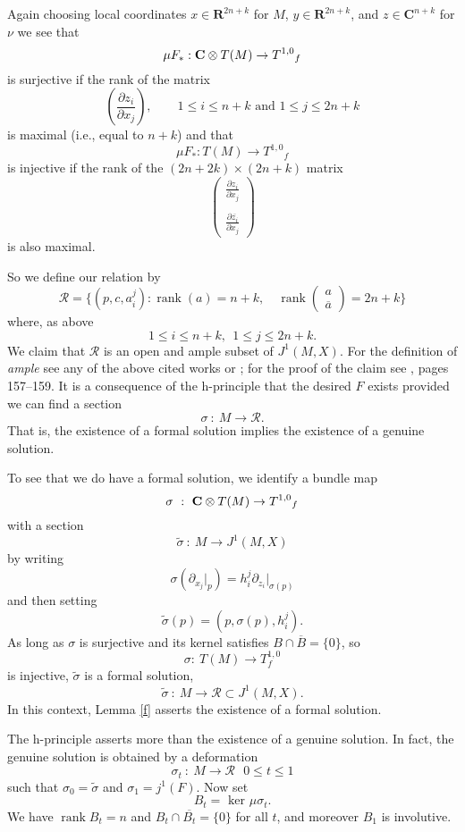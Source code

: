 \documentclass{amsart}
\begin{document}
Again choosing local coordinates $x\in {\mathbf{R}} ^{2n+k}$ for $M$, $y\in {\mathbf{R}} ^{2n+k}$, and  $z\in {\mathbf{C}} ^{n+k}$ for $\nu$ we see that 
\[
\mu F_* : {{\bf{C}}\otimes T(M)} \to {T^{1,0}} _f
\]
is surjective if the rank of the matrix
\[
\left(\frac {\partial z_i}{\partial x_j}\right),\quad\quad 1\leq i\leq n+k \text{ and } 1\leq j\leq 2n+k
\]
is maximal (i.e., equal to $n+k$) and that
\[
\mu  F_* : T(M) \to {T^{1,0}} _f
\]
is injective if the rank of the $(2n+2k)\times (2n+k)$ matrix 
\[
\left(\begin{array}{c}
\frac {\partial z_i}{\partial x_j}\\
\\
\frac {\partial \overline{z_i}}{\partial x_j}
\end{array}
\right)
\]
is also maximal.

So we define our relation by
\[
{{\mathcal R}} = \{ (p,c,a^j_i): \operatorname{rank} (a) =n+k,\quad \operatorname{rank} \left(\begin{array}{c}
a\\
\overline{a}
\end{array}
\right) = 2n+k\}
\]
where, as above
\[ 1\leq i\leq n+k,\ \ 1\leq j\leq 2n+k.
\]
We claim that ${{\mathcal R}}$ is an open and ample subset of ${J^1(M,X )}$.  For
the definition of \textit{ample} see any of the above cited works or \cite{JL};
for the proof of the claim see \cite {JL},  pages 157--159.  It is a consequence of the h-principle that the desired $F$ exists provided we can find a section
\[
\sigma\ :\ M\to {{\mathcal R}} .
\]
That is, the existence of a formal solution implies the existence of a genuine solution. 

To see that we do have a formal solution, we identify a bundle map
\[
\sigma\ :\ {{\bf{C}}\otimes T(M)} \to {T^{1,0}} _f
\]
with a section
\[
\tilde{\sigma }\ :\ M\to {J^1(M,X )}
\]
by writing
\[
\sigma (\partial _{x_j}\vert _p)=h^j_i\partial _{z_i}\vert _{\sigma (p)}
\]
and then setting
\[
\tilde {\sigma }(p)=(p,\sigma (p),h^j_i).
\]
As long as $\sigma$ is surjective and its kernel satisfies $B\cap
\overline{B}=\{ 0\}$, so 
\[
\sigma :\ T(M)\to T_f^{1,0}
\]
is injective, 
 $\tilde{\sigma }$ is a formal solution,
\[
\tilde{\sigma }\ :\ M\to {{\mathcal R}} \subset {J^1(M,X )} .
\]
In this context, Lemma \ref{f} asserts the existence of a formal solution.

The h-principle asserts more than the existence of a genuine solution.  In fact, the genuine solution is obtained by a deformation
\[
\sigma _t\ :\ M\to {{\mathcal R}} \ \ \ 0\leq t\leq 1
\] 
such that $\sigma _0=\tilde{\sigma }$ and $\sigma _1=j^1(F)$.
Now set 
\[
B_t=\text{ ker } \mu \sigma _t.
\]
We have $\operatorname{rank} B_t=n$ and $B_t\cap \overline{B_t}=\{ 0\}$ for all $t$, and moreover $B_1$ is involutive.
\end{document}
